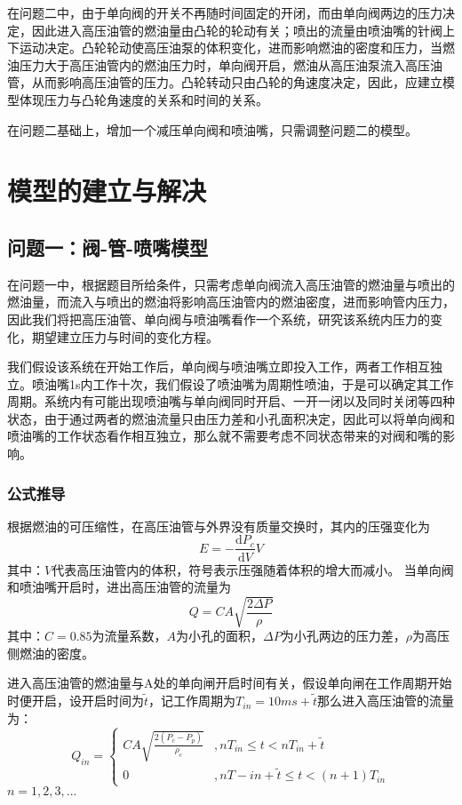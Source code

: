 \documentclass[withoutpreface,bwprint]{cumcmthesis} %
\begin{document}
	
	在问题二中，由于单向阀的开关不再随时间固定的开闭，而由单向阀两边的压力决定，因此进入高压油管的燃油量由凸轮的轮动有关；喷出的流量由喷油嘴的针阀上下运动决定。凸轮轮动使高压油泵的体积变化，进而影响燃油的密度和压力，当燃油压力大于高压油管内的燃油压力时，单向阀开启，燃油从高压油泵流入高压油管，从而影响高压油管的压力。凸轮转动只由凸轮的角速度决定，因此，应建立模型体现压力与凸轮角速度的关系和时间的关系。
	
	
	在问题二基础上，增加一个减压单向阀和喷油嘴，只需调整问题二的模型。
	
	
	\section{模型的建立与解决}
	\subsection{问题一：阀-管-喷嘴模型}
	在问题一中，根据题目所给条件，只需考虑单向阀流入高压油管的燃油量与喷出的燃油量，而流入与喷出的燃油将影响高压油管内的燃油密度，进而影响管内压力，因此我们将把高压油管、单向阀与喷油嘴看作一个系统，研究该系统内压力的变化，期望建立压力与时间的变化方程。
	
	我们假设该系统在开始工作后，单向阀与喷油嘴立即投入工作，两者工作相互独立。喷油嘴1s内工作十次，我们假设了喷油嘴为周期性喷油，于是可以确定其工作周期。系统内有可能出现喷油嘴与单向阀同时开启、一开一闭以及同时关闭等四种状态，由于通过两者的燃油流量只由压力差和小孔面积决定，因此可以将单向阀和喷油嘴的工作状态看作相互独立，那么就不需要考虑不同状态带来的对阀和嘴的影响。
	\subsubsection{公式推导}
	根据燃油的可压缩性，在高压油管与外界没有质量交换时，其内的压强变化为
	\begin{equation}
	E = -\frac{\mathrm{d}P_c}{\mathrm{d}V}V
	\end{equation}
	其中：$V$代表高压油管内的体积，符号表示压强随着体积的增大而减小。
	当单向阀和喷油嘴开启时，进出高压油管的流量为
	\begin{equation}
	Q = CA\sqrt{\frac{2\Delta P}{\rho}}
	\end{equation}
	其中：$C = 0.85$为流量系数，$A$为小孔的面积，$\Delta P$为小孔两边的压力差，$\rho$为高压侧燃油的密度。
	
	进入高压油管的燃油量与A处的单向闸开启时间有关，假设单向闸在工作周期开始时便开启，设开启时间为$\widetilde{t}$，记工作周期为$T_{in} = 10ms + \widetilde{t}$那么进入高压油管的流量为：
	\begin{equation}
	Q_{in} = \left\{ 
	\begin{array}{ll}
	CA\sqrt{\frac{2(P_c-P_p)}{\rho_c}}&,nT_{in}\leq t <nT_{in} + \widetilde{t} \\
	0&,nT
	-{in}+\widetilde{t}\leq t <(n+1)T_{in}
	\end{array}
	\right.
	\end{equation}
	$n = 1,2,3,...$
	
\end{document}
